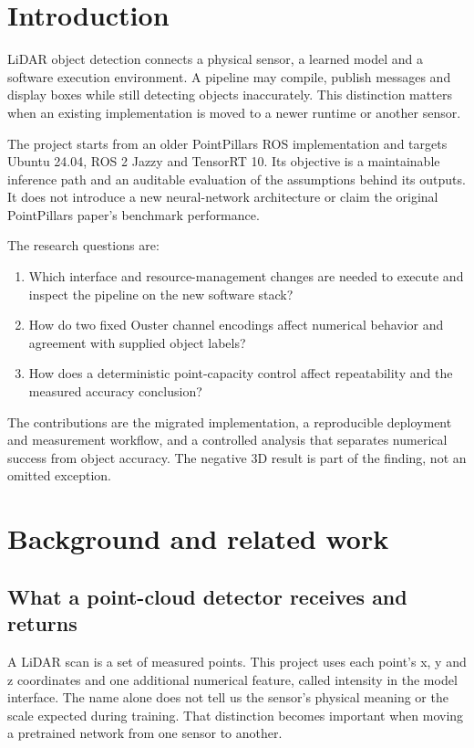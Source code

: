 \documentclass[11pt,a4paper]{article}
\begin{document}
\section{Introduction}
LiDAR object detection connects a physical sensor, a learned model and a
software execution environment. A pipeline may compile, publish messages and
display boxes while still detecting objects inaccurately. This distinction
matters when an existing implementation is moved to a newer runtime or another
sensor.

The project starts from an older PointPillars ROS implementation and targets
Ubuntu 24.04, ROS 2 Jazzy and TensorRT 10. Its objective is a maintainable inference
path and an auditable evaluation of the assumptions behind its outputs. It does
not introduce a new neural-network architecture or claim the original
PointPillars paper's benchmark performance.

The research questions are:
\begin{enumerate}
\item Which interface and resource-management changes are needed to execute and
inspect the pipeline on the new software stack?
\item How do two fixed Ouster channel encodings affect numerical behavior and
agreement with supplied object labels?
\item How does a deterministic point-capacity control affect repeatability and
the measured accuracy conclusion?
\end{enumerate}

The contributions are the migrated implementation, a reproducible deployment
and measurement workflow, and a controlled analysis that separates numerical
success from object accuracy. The negative 3D result is part of the finding,
not an omitted exception.

\section{Background and related work}
\subsection{What a point-cloud detector receives and returns}
A LiDAR scan is a set of measured points. This project uses each point's x, y and
z coordinates and one additional numerical feature, called intensity in the
model interface. The name alone does not tell us the sensor's physical meaning
or the scale expected during training. That distinction becomes important when
moving a pretrained network from one sensor to another.
\end{document}
